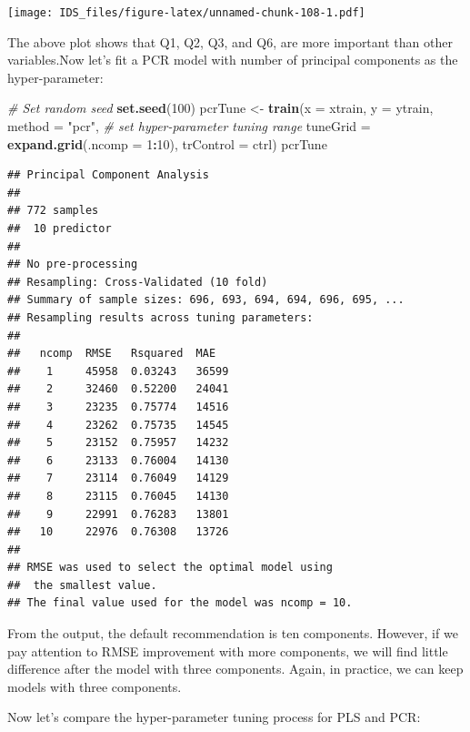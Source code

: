 \documentclass[12pt,]{krantz}
\makeatletter
\newenvironment{Shaded}{\begin{snugshade}}{\end{snugshade}}
\newcommand{\CommentTok}[1]{\textcolor[rgb]{0.37,0.37,0.37}{\textit{#1}}}
\newcommand{\DataTypeTok}[1]{\textcolor[rgb]{0.27,0.27,0.27}{#1}}
\newcommand{\DecValTok}[1]{\textcolor[rgb]{0.06,0.06,0.06}{#1}}
\newcommand{\KeywordTok}[1]{\textcolor[rgb]{0.27,0.27,0.27}{\textbf{#1}}}
\newcommand{\NormalTok}[1]{#1}
\newcommand{\OperatorTok}[1]{\textcolor[rgb]{0.43,0.43,0.43}{\textbf{#1}}}
\newcommand{\StringTok}[1]{\textcolor[rgb]{0.5,0.5,0.5}{#1}}
\newenvironment{kframe}{%
\medskip{}
\setlength{\fboxsep}{.8em}
 \def\at@end@of@kframe{}%
 \ifinner\ifhmode%
  \def\at@end@of@kframe{\end{minipage}}%
  \begin{minipage}{\columnwidth}%
 \fi\fi%
 \def\FrameCommand##1{\hskip\@totalleftmargin \hskip-\fboxsep
 \colorbox{shadecolor}{##1}\hskip-\fboxsep
     \hskip-\linewidth \hskip-\@totalleftmargin \hskip\columnwidth}%
 \MakeFramed {\advance\hsize-\width
   \@totalleftmargin\z@ \linewidth\hsize
   \@setminipage}}%
 {\par\unskip\endMakeFramed%
 \at@end@of@kframe}
\renewenvironment{Shaded}{\begin{kframe}}{\end{kframe}}
\makeatother
\begin{document}
\texttt{[image: IDS\_files/figure-latex/unnamed-chunk-108-1.pdf]}

The above plot shows that Q1, Q2, Q3, and Q6, are more important than other variables.Now let's fit a PCR model with number of principal components as the hyper-parameter: 

\begin{Shaded}
\begin{Highlighting}[]
\CommentTok{# Set random seed}
 \KeywordTok{set.seed}\NormalTok{(}\DecValTok{100}\NormalTok{)}
\NormalTok{ pcrTune <-}\StringTok{ }\KeywordTok{train}\NormalTok{(}\DataTypeTok{x =}\NormalTok{ xtrain, }\DataTypeTok{y =}\NormalTok{ ytrain,}
          \DataTypeTok{method =} \StringTok{"pcr"}\NormalTok{,}
          \CommentTok{# set hyper-parameter tuning range}
          \DataTypeTok{tuneGrid =} \KeywordTok{expand.grid}\NormalTok{(}\DataTypeTok{.ncomp =} \DecValTok{1}\OperatorTok{:}\DecValTok{10}\NormalTok{),}
          \DataTypeTok{trControl =}\NormalTok{ ctrl)}
\NormalTok{ pcrTune}
\end{Highlighting}
\end{Shaded}

\begin{verbatim}
## Principal Component Analysis 
## 
## 772 samples
##  10 predictor
## 
## No pre-processing
## Resampling: Cross-Validated (10 fold) 
## Summary of sample sizes: 696, 693, 694, 694, 696, 695, ... 
## Resampling results across tuning parameters:
## 
##   ncomp  RMSE   Rsquared  MAE  
##    1     45958  0.03243   36599
##    2     32460  0.52200   24041
##    3     23235  0.75774   14516
##    4     23262  0.75735   14545
##    5     23152  0.75957   14232
##    6     23133  0.76004   14130
##    7     23114  0.76049   14129
##    8     23115  0.76045   14130
##    9     22991  0.76283   13801
##   10     22976  0.76308   13726
## 
## RMSE was used to select the optimal model using
##  the smallest value.
## The final value used for the model was ncomp = 10.
\end{verbatim}

From the output, the default recommendation is ten components. However, if we pay attention to RMSE improvement with more components, we will find little difference after the model with three components. Again, in practice, we can keep models with three components.

Now let's compare the hyper-parameter tuning process for PLS and PCR:
\end{document}
